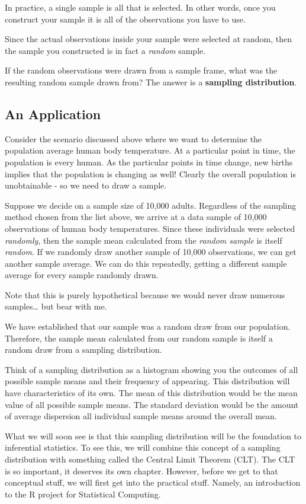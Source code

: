 \documentclass[
]{book}
\begin{document}
In practice, a single sample is all that is selected. In other words, once you construct your sample it is all of the observations you have to use.

Since the actual observations inside your sample were selected at random, then the sample you constructed is in fact a \emph{random} sample.

If the random observations were drawn from a sample frame, what was the resulting random sample drawn from? The answer is a \textbf{sampling distribution}.

\subsection{An Application}\label{an-application}

Consider the scenario discussed above where we want to determine the population average human body temperature. At a particular point in time, the population is every human. As the particular points in time change, new births implies that the population is changing as well! Clearly the overall population is unobtainable - so we need to draw a sample.

Suppose we decide on a sample size of 10,000 adults. Regardless of the sampling method chosen from the list above, we arrive at a data sample of 10,000 observations of human body temperatures. Since these individuals were selected \emph{randomly}, then the sample mean calculated from the \emph{random sample} is itself \emph{random}. If we randomly draw another sample of 10,000 observations, we can get another sample average. We can do this repeatedly, getting a different sample average for every sample randomly drawn.

Note that this is purely hypothetical because we would never draw numerous samples\ldots{} but bear with me.

We have established that our sample was a random draw from our population. Therefore, the sample mean calculated from our random sample is itself a random draw from a sampling distribution.

Think of a sampling distribution as a histogram showing you the outcomes of all possible sample means and their frequency of appearing. This distribution will have characteristics of its own. The mean of this distribution would be the mean value of all possible sample means. The standard deviation would be the amount of average dispersion all individual sample means around the overall mean.

What we will soon see is that this sampling distribution will be the foundation to inferential statistics. To see this, we will combine this concept of a sampling distribution with something called the Central Limit Theorem (CLT). The CLT is so important, it deserves its own chapter. However, before we get to that conceptual stuff, we will first get into the practical stuff. Namely, an introduction to the R project for Statistical Computing.
\end{document}

